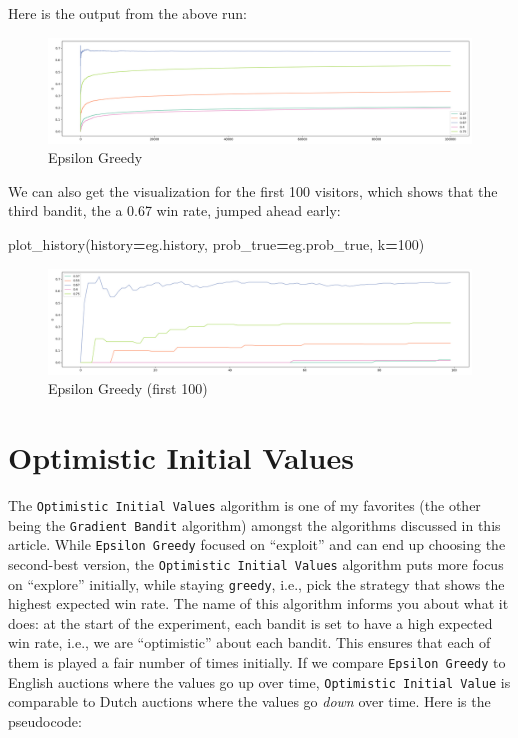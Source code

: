 \documentclass[
]{book}
\newenvironment{Shaded}{\begin{snugshade}}{\end{snugshade}}
\newcommand{\DecValTok}[1]{\textcolor[rgb]{0.00,0.00,0.81}{#1}}
\newcommand{\NormalTok}[1]{#1}
\newcommand{\OperatorTok}[1]{\textcolor[rgb]{0.81,0.36,0.00}{\textbf{#1}}}
\theoremstyle{definition}
\theoremstyle{definition}
\theoremstyle{definition}
\theoremstyle{definition}
\theoremstyle{remark}
\begin{document}
Here is the output from the above run:

\begin{figure}
\centering
\includegraphics{images/eg.png}
\caption{Epsilon Greedy}
\end{figure}

We can also get the visualization for the first 100 visitors, which shows that the third bandit, the a 0.67 win rate, jumped ahead early:

\begin{Shaded}
\begin{Highlighting}[]
\NormalTok{plot\_history(history}\OperatorTok{=}\NormalTok{eg.history, prob\_true}\OperatorTok{=}\NormalTok{eg.prob\_true, k}\OperatorTok{=}\DecValTok{100}\NormalTok{)}
\end{Highlighting}
\end{Shaded}

\begin{figure}
\centering
\includegraphics{images/eg_100.png}
\caption{Epsilon Greedy (first 100)}
\end{figure}

\hypertarget{optimistic-initial-values}{%
\section{Optimistic Initial Values}\label{optimistic-initial-values}}

The \texttt{Optimistic\ Initial\ Values} algorithm is one of my favorites (the other being the \texttt{Gradient\ Bandit} algorithm) amongst the algorithms discussed in this article. While \texttt{Epsilon\ Greedy} focused on ``exploit'' and can end up choosing the second-best version, the \texttt{Optimistic\ Initial\ Values} algorithm puts more focus on ``explore'' initially, while staying \texttt{greedy}, i.e., pick the strategy that shows the highest expected win rate. The name of this algorithm informs you about what it does: at the start of the experiment, each bandit is set to have a high expected win rate, i.e., we are ``optimistic'' about each bandit. This ensures that each of them is played a fair number of times initially. If we compare \texttt{Epsilon\ Greedy} to English auctions where the values go up over time, \texttt{Optimistic\ Initial\ Value} is comparable to Dutch auctions where the values go \emph{down} over time. Here is the pseudocode:
\end{document}
